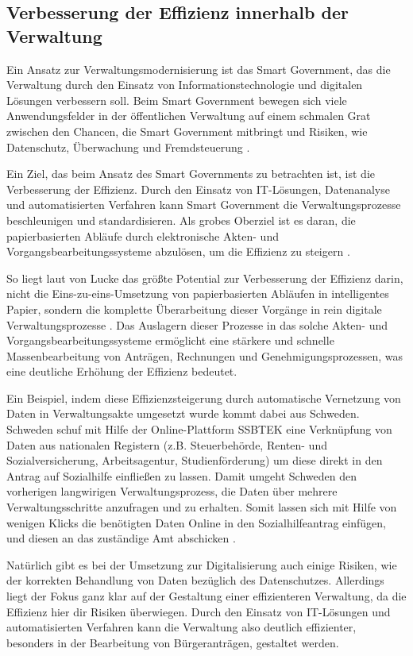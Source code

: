 \subsection{Verbesserung der Effizienz innerhalb der Verwaltung}
Ein Ansatz zur Verwaltungsmodernisierung ist das Smart Government, das die Verwaltung durch den Einsatz von Informationstechnologie und digitalen Lösungen verbessern soll.
Beim Smart Government bewegen sich viele Anwendungsfelder in der öffentlichen Verwaltung auf einem schmalen Grat zwischen den Chancen, die Smart Government mitbringt und Risiken, wie Datenschutz, Überwachung und Fremdsteuerung \citep[Vgl.][]{Lucke2018}.
\par
Ein Ziel, das beim Ansatz des Smart Governments zu betrachten ist, ist die Verbesserung der Effizienz.
Durch den Einsatz von IT-Lösungen, Datenanalyse und automatisierten Verfahren kann Smart Government die Verwaltungsprozesse beschleunigen und standardisieren. 
Als grobes Oberziel ist es daran, die papierbasierten Abläufe durch elektronische Akten- und Vorgangsbearbeitungssysteme abzulösen, um die Effizienz zu steigern \citep[][]{von_Lucke_2016}.
\par
So liegt laut von Lucke das größte Potential zur Verbesserung der Effizienz darin, nicht die Eins-zu-eins-Umsetzung von papierbasierten Abläufen in intelligentes Papier, sondern die komplette Überarbeitung dieser Vorgänge in rein digitale Verwaltungsprozesse \citep[][S.179]{von_Lucke_2016}.
Das Auslagern dieser Prozesse in das solche Akten- und Vorgangsbearbeitungssysteme ermöglicht eine stärkere und schnelle Massenbearbeitung von Anträgen, Rechnungen und Genehmigungsprozessen, was eine deutliche Erhöhung der Effizienz bedeutet.
\par
Ein Beispiel, indem diese Effizienzsteigerung durch automatische Vernetzung von Daten in Verwaltungsakte umgesetzt wurde kommt dabei aus Schweden.
Schweden schuf mit Hilfe der Online-Plattform SSBTEK eine Verknüpfung von Daten aus nationalen Registern (z.B. Steuerbehörde, Renten- und Sozialversicherung, Arbeitsagentur, Studienförderung) um diese direkt in den Antrag auf Sozialhilfe einfließen zu lassen.
Damit umgeht Schweden den vorherigen langwirigen Verwaltungsprozess, die Daten über mehrere Verwaltungsschritte anzufragen und zu erhalten.
Somit lassen sich mit Hilfe von wenigen Klicks die benötigten Daten Online in den Sozialhilfeantrag einfügen, und diesen an das zuständige Amt abschicken \citep[][]{NationalenNormenkontrollrat2017}.
\par
Natürlich gibt es bei der Umsetzung zur Digitalisierung auch einige Risiken, wie der korrekten Behandlung von Daten bezüglich des Datenschutzes.
Allerdings liegt der Fokus ganz klar auf der Gestaltung einer effizienteren Verwaltung, da die Effizienz hier dir Risiken überwiegen.
Durch den Einsatz von IT-Lösungen und automatisierten Verfahren kann die Verwaltung also deutlich effizienter, besonders in der Bearbeitung von Bürgeranträgen, gestaltet werden.